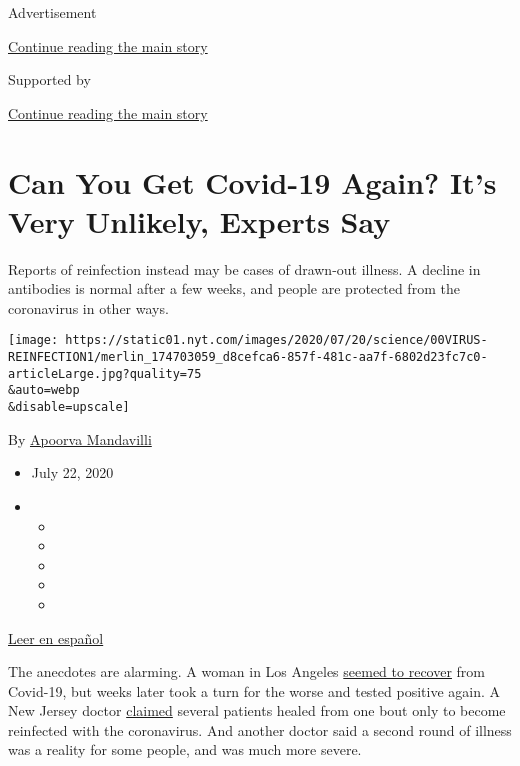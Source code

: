 Advertisement

\protect\hyperlink{after-top}{Continue reading the main story}

Supported by

\protect\hyperlink{after-sponsor}{Continue reading the main story}

\hypertarget{can-you-get-covid-19-again-its-very-unlikely-experts-say}{%
\section{Can You Get Covid-19 Again? It's Very Unlikely, Experts
Say}\label{can-you-get-covid-19-again-its-very-unlikely-experts-say}}

Reports of reinfection instead may be cases of drawn-out illness. A
decline in antibodies is normal after a few weeks, and people are
protected from the coronavirus in other ways.

\texttt{[image: https://static01.nyt.com/images/2020/07/20/science/00VIRUS-REINFECTION1/merlin\_174703059\_d8cefca6-857f-481c-aa7f-6802d23fc7c0-articleLarge.jpg?quality=75\\\&auto=webp\\\&disable=upscale]}

By \href{https://www.nytimes.com/by/apoorva-mandavilli}{Apoorva
Mandavilli}

\begin{itemize}
\item
  July 22, 2020
\item
  \begin{itemize}
  \item
  \item
  \item
  \item
  \item
  \end{itemize}
\end{itemize}

\href{https://www.nytimes.com/es/2020/07/24/espanol/ciencia-y-tecnologia/reinfeccion-coronavirus.html}{Leer
en español}

The anecdotes are alarming. A woman in Los Angeles
\href{https://www.foxla.com/news/southern-california-woman-tests-positive-for-covid-19-for-second-time-after-initial-recovery}{seemed
to recover} from Covid-19, but weeks later took a turn for the worse and
tested positive again. A New Jersey doctor
\href{https://dailyvoice.com/new-jersey/monmouth/news/central-jersey-doctor-reports-patients-reinfected-with-coronavirus/790555/}{claimed}
several patients healed from one bout only to become reinfected with the
coronavirus. And another doctor said a second round of illness was a
reality for some people, and was much more severe.

